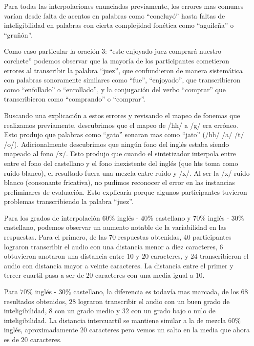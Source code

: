 Para todas las interpolaciones enunciadas previamente, los errores mas comunes varían desde falta de acentos en palabras como ``concluyó'' hasta faltas de inteligibilidad en palabras con cierta complejidad fonética como ``aguileña'' o ``gruñón''.

Como caso particular la oración $3$: ``este enjoyado juez comprará nuestro corchete'' podemos observar que la mayoría de los participantes cometieron errores al transcribir la palabra ``juez'', que confundieron de manera sistemática con palabras sonoramente similares como ``fue'', ``enjoyado'', que transcribieron como ``enfollado'' o ``enrollado'', y la conjugación del verbo ``comprar'' que transcribieron como ``comprando'' o ``comprar''.

Buscando una explicación a estos errores y revisando el mapeo de fonemas que realizamos previamente, descubrimos que el mapeo de /hh/ a /g/ era erróneo. Esto produjo que palabras como ``gato'' sonaran mas como ``jato'' (/hh/ /a/ /t/ /o/). Adicionalmente descubrimos que ningún fono del inglés estaba siendo mapeado al fono /x/. Esto produjo que cuando el sintetizador interpola entre entre el fono del castellano y el fono inexistente del inglés (que hts toma como ruido blanco), el resultado fuera una mezcla entre ruido y /x/. Al ser la /x/ ruido blanco (consonante fricativa), no pudimos reconocer el error en las instancias preliminares de evaluación. Esto explicaría porque algunos participantes tuvieron problemas transcribiendo la palabra ``juez''.

Para los grados de interpolación $60\%$ inglés - $40\%$ castellano y $70\%$ inglés - $30\%$ castellano, podemos observar un aumento notable de la variabilidad en las respuestas. Para el primero, de las $70$ respuestas obtenidas, $40$ participantes lograron transcribir el audio con una distancia menor a diez caracteres, $6$ obtuvieron anotaron una distancia entre $10$ y $20$ caracteres, y $24$ transcribieron el audio con distancia mayor a veinte caracteres. La distancia entre el primer y tercer cuartil pasa a ser de $20$ caracteres con una media igual a $10$.

Para $70\%$ inglés - $30\%$ castellano, la diferencia es todavía mas marcada, de los $68$ resultados obtenidos, $28$ lograron transcribir el audio con un buen grado de inteligibilidad, $8$ con un grado medio y $32$ con un grado bajo o nulo de inteligibilidad. La distancia intercuartil se mantiene similar a la de mezcla $60\%$ inglés, aproximadamente $20$ caracteres pero vemos un salto en la media que ahora es de $20$ caracteres.

